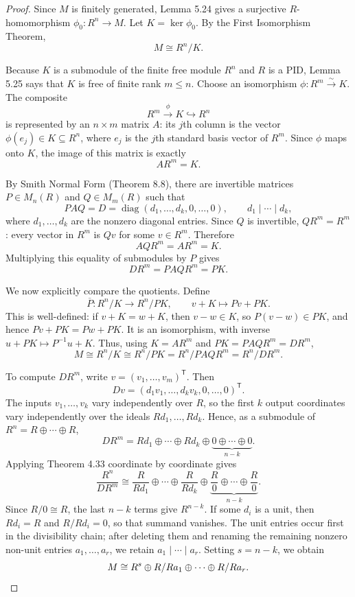 \documentclass[12pt]{article}
\begin{document}
\begin{proof}
Since $M$ is finitely generated, Lemma 5.24 gives a surjective $R$-homomorphism $\phi_0 : R^n \to M$. Let $K = \ker \phi_0$. By the First Isomorphism Theorem,
\[
  M \cong R^n/K.
\]

Because $K$ is a submodule of the finite free module $R^n$ and $R$ is a PID, Lemma 5.25 says that $K$ is free of finite rank $m \leq n$. Choose an isomorphism $\phi : R^m \xrightarrow{\sim} K$. The composite
\[
  R^m \xrightarrow{\phi} K \hookrightarrow R^n
\]
is represented by an $n \times m$ matrix $A$: its $j$th column is the vector $\phi(e_j) \in K \subseteq R^n$, where $e_j$ is the $j$th standard basis vector of $R^m$. Since $\phi$ maps onto $K$, the image of this matrix is exactly
\[
  AR^m = K.
\]

By Smith Normal Form (Theorem 8.8), there are invertible matrices $P \in M_n(R)$ and $Q \in M_m(R)$ such that
\[
  PAQ = D = \operatorname{diag}(d_1, \ldots, d_k, 0, \ldots, 0),
  \qquad d_1 \mid \cdots \mid d_k,
\]
where $d_1,\ldots,d_k$ are the nonzero diagonal entries. Since $Q$ is invertible, $QR^m=R^m$: every vector in $R^m$ is $Qv$ for some $v \in R^m$. Therefore
\[
  AQR^m = AR^m = K.
\]
Multiplying this equality of submodules by $P$ gives
\[
  DR^m = PAQR^m = PK.
\]

We now explicitly compare the quotients. Define
\[
  \overline{P}:R^n/K \longrightarrow R^n/PK,
  \qquad v+K \longmapsto Pv+PK.
\]
This is well-defined: if $v+K=w+K$, then $v-w \in K$, so $P(v-w) \in PK$, and hence $Pv+PK=Pw+PK$. It is an isomorphism, with inverse $u+PK \mapsto P^{-1}u+K$. Thus, using $K=AR^m$ and $PK=PAQR^m=DR^m$,
\[
  M \cong R^n/K \cong R^n/PK
    = R^n/PAQR^m
    = R^n/DR^m.
\]

To compute $DR^m$, write $v=(v_1,\ldots,v_m)^{\mathsf T}$. Then
\[
  Dv=(d_1v_1,\ldots,d_kv_k,0,\ldots,0)^{\mathsf T}.
\]
The inputs $v_1,\ldots,v_k$ vary independently over $R$, so the first $k$ output coordinates vary independently over the ideals $Rd_1,\ldots,Rd_k$. Hence, as a submodule of $R^n=R\oplus\cdots\oplus R$,
\[
  DR^m = Rd_1 \oplus \cdots \oplus Rd_k
    \oplus \underbrace{0 \oplus \cdots \oplus 0}_{n-k}.
\]
Applying Theorem 4.33 coordinate by coordinate gives
\[
  \frac{R^n}{DR^m}
  \cong
  \frac{R}{Rd_1} \oplus \cdots \oplus \frac{R}{Rd_k}
  \oplus \underbrace{\frac{R}{0} \oplus \cdots \oplus \frac{R}{0}}_{n-k}.
\]
Since $R/0 \cong R$, the last $n-k$ terms give $R^{n-k}$. If some $d_i$ is a unit, then $Rd_i=R$ and $R/Rd_i=0$, so that summand vanishes. The unit entries occur first in the divisibility chain; after deleting them and renaming the remaining nonzero non-unit entries $a_1,\ldots,a_r$, we retain $a_1 \mid \cdots \mid a_r$. Setting $s=n-k$, we obtain
\[
  M \cong R^s \oplus R/Ra_1 \oplus \cdots \oplus R/Ra_r. \qedhere
\]
\end{proof}
\end{document}
